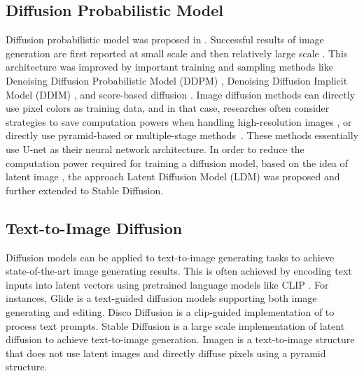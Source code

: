 \documentclass{article}
\begin{document}
\subsection{Diffusion Probabilistic Model}

Diffusion probabilistic model was proposed in \cite{DBLP:journals/corr/Sohl-DicksteinW15}. Successful results of image generation are first reported at small scale \cite{DBLP:journals/corr/abs-2107-00630} and then relatively large scale \cite{DBLP:journals/corr/abs-2105-05233}. This architecture was improved by important training and sampling methods like Denoising Diffusion Probabilistic Model (DDPM) \cite{DBLP:conf/nips/HoJA20}, Denoising Diffusion Implicit Model (DDIM) \cite{DBLP:conf/iclr/SongME21}, and score-based diffusion \cite{DBLP:journals/corr/abs-2011-13456}.
Image diffusion methods can directly use pixel colors as training data, and in that case, researches often consider strategies to save computation powers when handling high-resolution images \cite{DBLP:conf/iclr/SongME21, DBLP:journals/corr/abs-2104-02600, DBLP:journals/corr/abs-2106-00132}, or directly use pyramid-based or multiple-stage methods~\cite{DBLP:journals/corr/abs-2106-15282, ramesh2022hierarchical}.
These methods essentially use U-net \cite{DBLP:conf/miccai/RonnebergerFB15} as their neural network architecture.
In order to reduce the computation power required for training a diffusion model, based on the idea of latent image \cite{DBLP:journals/corr/abs-2012-09841}, the approach Latent Diffusion Model (LDM) \cite{rombach2021highresolution} was proposed and further extended to Stable Diffusion. 

\subsection{Text-to-Image Diffusion}

Diffusion models can be applied to text-to-image generating tasks to achieve state-of-the-art image generating results. This is often achieved by encoding text inputs into latent vectors using pretrained language models like CLIP \cite{2103.00020}. For instances, Glide \cite{nichol2021glide} is a text-guided diffusion models supporting both image generating and editing. Disco Diffusion is a clip-guided implementation of \cite{DBLP:journals/corr/abs-2105-05233} to process text prompts. Stable Diffusion is a large scale implementation of latent diffusion \cite{rombach2021highresolution} to achieve text-to-image generation. Imagen \cite{saharia2022photorealistic} is a text-to-image structure that does not use latent images and directly diffuse pixels using a pyramid structure.
\end{document}
